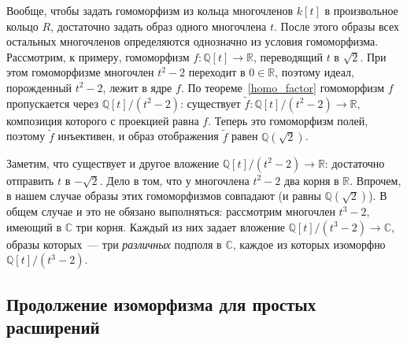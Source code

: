 \documentclass[a4paper,11pt]{scrartcl}
\theoremstyle{plain}
\theoremstyle{definition}
\newcommand\mb{\mathbb}
\newcommand\wt{\widetilde}
\begin{document}
Вообще, чтобы задать гомоморфизм из кольца многочленов $k[t]$ в
произвольное кольцо $R$, достаточно задать образ одного многочлена
$t$. После этого образы всех остальных многочленов определяются
однозначно из условия гомоморфизма.
Рассмотрим, к примеру, гомоморфизм $f\colon\mb Q[t]\to\mb R$,
переводящий $t$
в $\sqrt{2}$. При этом гомоморфизме многочлен $t^2-2$ переходит в
$0\in\mb R$, поэтому идеал, порожденный $t^2-2$, лежит в ядре $f$. По
теореме~\ref{homo_factor} гомоморфизм $f$ пропускается через $\mb
Q[t]/(t^2-2)$: существует $\wt{f}\colon\mb Q[t]/(t^2-2)\to\mb R$,
композиция которого с проекцией равна $f$. Теперь это гомоморфизм
полей, поэтому $\wt{f}$ инъективен, и образ отображения $\wt{f}$
равен $\mb Q(\sqrt{2})$.

Заметим, что существует и другое
вложение $\mb Q[t]/(t^2-2)\to\mb R$: достаточно отправить $t$ в
$-\sqrt{2}$. Дело в том, что у многочлена $t^2-2$ два корня в $\mb
R$. Впрочем, в нашем случае образы этих гомоморфизмов совпадают (и
равны $\mb Q(\sqrt{2})$). В общем случае и это не обязано выполняться:
рассмотрим многочлен $t^3-2$, имеющий в $\mb C$ три корня. Каждый из
них задает вложение $\mb Q[t]/(t^3-2)\to\mb C$, образы которых~--- три
\emph{различных} подполя в $\mb C$, каждое из которых изоморфно
$\mb Q[t]/(t^3-2)$.

\subsection{Продолжение изоморфизма для простых расширений}
\end{document}
